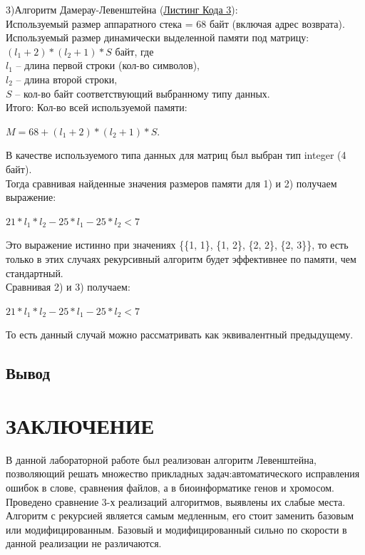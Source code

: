 \documentclass[a4paper,12pt]{article}
\newcommand{\anonsection}[1]{\section*{#1}\addcontentsline{toc}{section}{#1}}
\begin{document}
3)Алгоритм Дамерау-Левенштейна (\hyperref[listings:listing3]{Листинг Кода 3}): \\
Используемый размер аппаратного стека = 68 байт (включая адрес возврата). \\
Используемый размер динамически выделенной памяти под матрицу: \\
$(l_1 + 2) * (l_2 + 1) * S$ байт, где \\
$l_1$ – длина первой строки (кол-во символов), \\
$l_2$ – длина второй строки, \\
$S$ – кол-во байт соответствующий выбранному типу данных. \\
Итого: Кол-во всей используемой памяти:\\
\begin{center}
$M = 68 + (l_1 + 2) * (l_2 + 1) * S$.
\end{center}
В качестве используемого типа данных для матриц был выбран тип integer (4 байт). \\
Тогда сравнивая найденные значения размеров памяти для 1) и 2) получаем выражение: \\
\begin{center}
$21 * l_1 * l_2 - 25 * l_1 - 25 * l_2 < 7$
\end{center}
Это выражение истинно при значениях \{\{1, 1\}, \{1, 2\}, \{2, 2\}, \{2, 3\}\}, то есть только в этих случаях рекурсивный алгоритм будет эффективнее по памяти, чем стандартный. \\
Сравнивая 2) и 3) получаем: \\
\begin{center}
$21 * l_1 * l_2 - 25 * l_1 - 25 * l_2 < 7$
\end{center}
То есть данный случай можно рассматривать как эквивалентный предыдущему. \\

\newpage
\subsection{Вывод}

\newpage
\anonsection{ЗАКЛЮЧЕНИЕ}

В данной лабораторной работе был реализован алгоритм Левенштейна, позволяющий решать множество прикладных задач:автоматического исправления ошибок в слове, сравнения файлов, а в биоинформатике генов и хромосом. Проведено сравнение 3-х реализаций алгоритмов, выявлены их слабые места. Алгоритм с рекурсией является самым медленным, его стоит заменить базовым или модифицированным. Базовый и модифицированный сильно по скорости в данной реализации не различаются.
\end{document}
